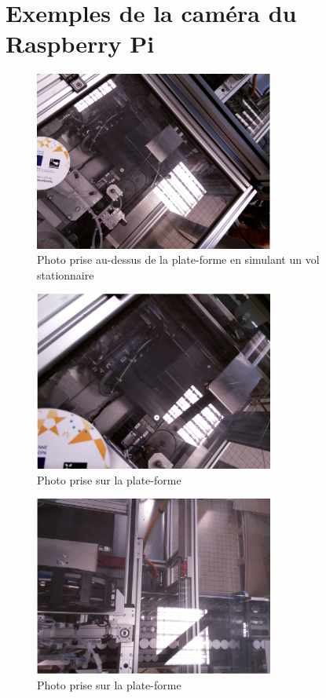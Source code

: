 \documentclass[12pt]{beamer}
\begin{document}
	\section{Exemples de la caméra du Raspberry Pi}
	\begin{frame}[allowframebreaks]
        \begin{figure}
            \centering
            \includegraphics[width=0.7\textwidth]{imageStatioInf1.png}
            \caption*{Photo prise au-dessus de la plate-forme en simulant un vol stationnaire}
        \end{figure}
        
        \begin{figure}
            \centering
            \includegraphics[width=0.7\textwidth]{imageStatioInf2.png}
            \caption*{Photo prise sur la plate-forme}
        \end{figure}
        
        \begin{figure}
            \centering
            \includegraphics[width=0.7\textwidth]{imageStationnaireSup1.png}
            \caption*{Photo prise sur la plate-forme}
        \end{figure}
        

\end{frame}
\end{document}
